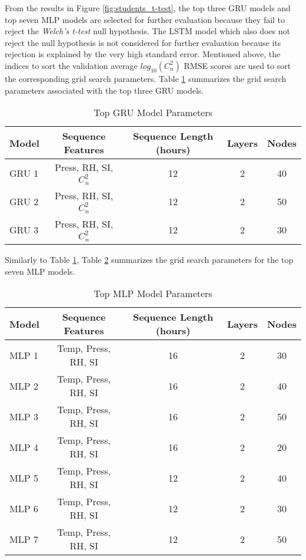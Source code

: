 From the results in Figure \ref{fig:students_t-test}, the top three GRU models and top seven MLP models are selected for further evaluation because they fail to reject the \textit{Welch's t-test} null hypothesis. The LSTM model which also does not reject the null hypothesis is not considered for further evaluation because its rejection is explained by the very high standard error. Mentioned above, the indices to sort the validation average $log_{10}(C_{n}^{2})$ RMSE scores are used to sort the corresponding grid search parameters. Table \ref{tab:grid_search_results_GRU} summarizes the grid search parameters associated with the top three GRU models.
\begin{table}[h!]
	\begin{center}
		\caption{Top GRU Model Parameters}
		\label{tab:grid_search_results_GRU}
		\begin{tabular}{||l|c|c|c|c||}
			\hline
			Model & Sequence Features & Sequence Length (hours) & Layers & Nodes \\
			\hline
			\hline
			GRU 1 & Press, RH, SI, $C_{n}^{2}$ & 12 & 2 & 40 \\
			\hline
			GRU 2 & Press, RH, SI, $C_{n}^{2}$ & 12 & 2 & 50 \\
			\hline
			GRU 3 & Press, RH, SI, $C_{n}^{2}$ & 12 & 2 & 30 \\
			\hline
		\end{tabular}
	\end{center}
\end{table}

Similarly to Table \ref{tab:grid_search_results_GRU}, Table \ref{tab:grid_search_results_MLP} summarizes the grid search parameters for the top seven MLP models.
\begin{table}[h!]
	\begin{center}
		\caption{Top MLP Model Parameters}
		\label{tab:grid_search_results_MLP}
		\begin{tabular}{||l|c|c|c|c||}
			\hline
			Model & Sequence Features & Sequence Length (hours) & Layers & Nodes \\
			\hline
			\hline
			MLP 1 & Temp, Press, RH, SI & 16 & 2 & 30 \\
			\hline
			MLP 2 & Temp, Press, RH, SI & 16 & 2 & 40 \\
			\hline
			MLP 3 & Temp, Press, RH, SI & 16 & 2 & 50 \\
			\hline
			MLP 4 & Temp, Press, RH, SI & 16 & 2 & 20 \\
			\hline
			MLP 5 & Temp, Press, RH, SI & 12 & 2 & 40 \\
			\hline
			MLP 6 & Temp, Press, RH, SI & 12 & 2 & 30 \\
			\hline
			MLP 7 & Temp, Press, RH, SI & 12 & 2 & 50 \\
			\hline
			
		\end{tabular}
	\end{center}
\end{table}

